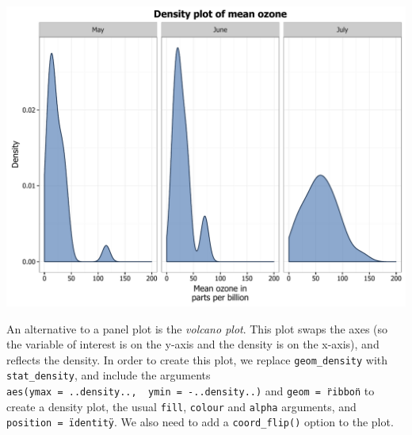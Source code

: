 \begin{center}\includegraphics[width=0.55\linewidth]{figures/density_14-1} \end{center}

An alternative to a panel plot is the \emph{volcano plot}. This plot
swaps the axes (so the variable of interest is on the y-axis and the
density is on the x-axis), and reflects the density. In order to create
this plot, we replace \texttt{geom\_density} with
\texttt{stat\_density}, and include the arguments
\texttt{aes(ymax\ =\ ..density..,\ \ ymin\ =\ -..density..)} and
\texttt{geom\ =\ \"ribbon\"} to create a density plot, the usual
\texttt{fill}, \texttt{colour} and \texttt{alpha} arguments, and
\texttt{position\ =\ \"identity\"}. We also need to add a
\texttt{coord\_flip()} option to the plot.

